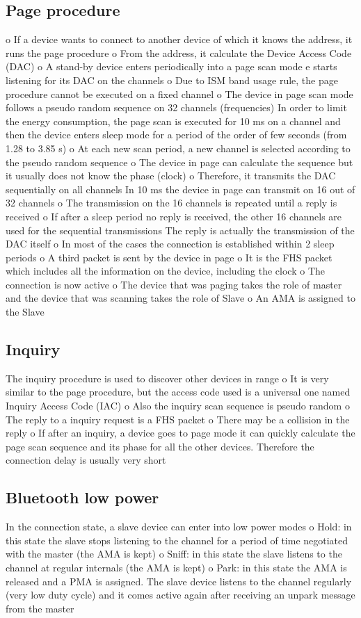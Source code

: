 \subsection{Page procedure}
o If a device wants to connect to another
device of which it knows the address, it runs
the page procedure
o From the address, it calculate the Device
Access Code (DAC)
o A stand-by device enters periodically into a page scan mode e starts listening for its DAC
on the channels
o Due to ISM band usage rule, the page
procedure cannot be executed on a fixed
channel
o The device in page scan mode follows a
pseudo random sequence on 32 channels
(frequencies)
In order to limit the energy consumption, the
page scan is executed for 10 ms on a channel
and then the device enters sleep mode for a
period of the order of few seconds (from
1.28 to 3.85 s)
o At each new scan period, a new channel is
selected according to the pseudo random
sequence
o The device in page can calculate the sequence
but it usually does not know the phase (clock)
o Therefore, it transmits the DAC sequentially on
all channels
In 10 ms the device in page can transmit on 16 out of 32 channels
o The transmission on the 16 channels is repeated
until a reply is received
o If after a sleep period no reply is received, the
other 16 channels are used for the sequential
transmissions
The reply is actually the transmission of the DAC
itself
o In most of the cases the connection is established
within 2 sleep periods
o A third packet is sent by the device in page
o It is the FHS packet which includes all the
information on the device, including the clock
o The connection is now active
o The device that was paging takes the role of
master and the device that was scanning takes
the role of Slave
o An AMA is assigned to the Slave

\subsection{Inquiry}
The inquiry procedure is used to discover
other devices in range
o It is very similar to the page procedure, but
the access code used is a universal one
named Inquiry Access Code (IAC)
o Also the inquiry scan sequence is pseudo
random
o The reply to a inquiry request is a FHS packet
o There may be a collision in the reply
o If after an inquiry, a device goes to page
mode it can quickly calculate the page scan
sequence and its phase for all the other
devices. Therefore the connection delay is
usually very short

\subsection{Bluetooth low power}
In the connection state, a slave device can
enter into low power modes
o Hold: in this state the slave stops listening to the channel for a period of time negotiated
with the master (the AMA is kept)
o Sniff: in this state the slave listens to the
channel at regular internals (the AMA is
kept)
o Park: in this state the AMA is released and a
PMA is assigned. The slave device listens to
the channel regularly (very low duty cycle)
and it comes active again after receiving an
unpark message from the master




